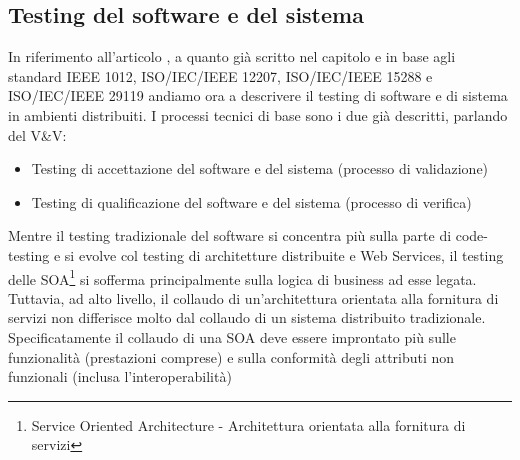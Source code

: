 \subsection{Testing del software e del sistema}
In riferimento all'articolo \cite{disttest}, a quanto già scritto nel capitolo e in base agli standard IEEE 1012\cite{ieee1012}, ISO/IEC/IEEE 12207\cite{iso12207}, ISO/IEC/IEEE 15288\cite{iso15288} e ISO/IEC/IEEE 29119\cite{iso29119} andiamo ora a descrivere il testing di software e di sistema in ambienti distribuiti.
I processi tecnici di base sono i due già descritti, parlando del V\&V:
\begin{itemize}
\item Testing di accettazione del software e del sistema (processo di validazione)
\item Testing di qualificazione del software e del sistema (processo di verifica)
\end{itemize}
Mentre il testing tradizionale del software si concentra più sulla parte di code-testing e si evolve col testing di architetture distribuite e Web Services, il testing delle SOA\footnote{Service Oriented Architecture - Architettura orientata alla fornitura di servizi} si sofferma principalmente sulla logica di business\cite{disttestSoaTest1} ad esse legata. Tuttavia, ad alto livello, il collaudo di un'architettura orientata alla fornitura di servizi non differisce molto dal collaudo di un sistema distribuito tradizionale.
Specificatamente il collaudo di una SOA deve essere improntato più sulle funzionalità (prestazioni comprese) e sulla conformità degli attributi non funzionali (inclusa l'interoperabilità)\cite{disttestSoaTest2}

